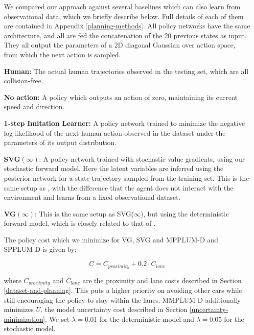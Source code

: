 \documentclass{article} %
\begin{document}
    We compared our approach against several baselines which can also learn from observational data, which we briefly describe below. Full details of each of them are contained in Appendix \ref{planning-methods}.
    All policy networks have the same architecture, and all are fed the concatenation of the 20 previous states as input. They all output the parameters of a 2D diagonal Gaussian over action space, from which the next action is sampled.

    \textbf{Human:} The actual human trajectories observed in the testing set, which are all collision-free.
    
    \textbf{No action:} A policy which outputs an action of zero, maintaining its current speed and direction.

    \textbf{1-step Imitation Learner:} A policy network trained to minimize the negative log-likelihood of the next human action observed in the dataset under the parameters of its output distribution.
    
    \textbf{SVG$(\infty)$}: A policy network trained with stochastic value gradients, using our stochastic forward model. Here the latent variables are inferred using the posterior network for a state trajectory sampled from the training set. This is the same setup as \citep{SVG}, with the difference that the agent does not interact with the environment and learns from a fixed observational dataset.
    
    \textbf{VG$(\infty)$}: This is the same setup as SVG($\infty$), but using the deterministic forward model, which is closely related to that of \citep{Nguyen1989}.  







    The policy cost which we minimize for VG, SVG and MPPLUM-D and SPPLUM-D is given by:

    \begin{equation}
      C = C_{proximity} + 0.2 \cdot C_{lane}
    \end{equation}

    where $C_{proximity}$ and $C_{lane}$ are the proximity and lane costs described in Section \ref{dataset-and-planning}. This puts a higher priority on avoiding other cars while still encouraging the policy to stay within the lanes. MMPLUM-D additionally minimizes $U$, the model uncertainty cost described in Section \ref{uncertainty-minimization}. We set $\lambda=0.01$ for the deterministic model and $\lambda=0.05$ for the stochastic model. 
\end{document}
